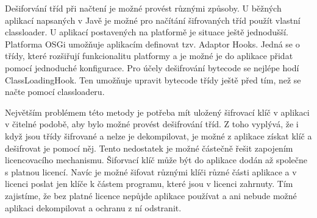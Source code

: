 Dešiforvání tříd při načtení je možné provést různými způsoby. U běžných
aplikací napsaných v Javě je možné pro načítání šifrovaných tříd použít vlastní
classloader. U aplikací postavených na platformě  je situace ještě
jednodušší. Platforma \gls{OSGi} umožňuje aplikacím definovat tzv. Adaptor
Hooks. Jedná se o třídy, které rozšiřují funkcionalitu platformy a je možné je
do aplikace přidat pomocí jednoduché konfigurace. Pro účely dešifrování bytecode
se nejlépe hodí ClassLoadingHook. Ten umožňuje upravit bytecode třídy ještě před
tím, než se načte pomocí classloaderu.

Největším problémem této metody je potřeba mít uložený šifrovací klíč v
aplikaci v čitelné podobě, aby bylo možné provést dešifrování tříd. Z toho
vyplývá, že i když jsou třídy šifrované a nelze je dekompilovat, je možné z
aplikace získat klíč a dešifrovat je pomocí něj. Tento nedostatek je možné
částečně řešit zapojením licencovacího mechanismu. Šiforvací klíč může
být do aplikace dodán až společne s platnou licencí. Navíc je možné šifovat
různými klíči různé části aplikace a v licenci poslat jen klíče k částem
programu, které jsou v licenci zahrnuty. Tím zajistíme, že bez platné licence
nepůjde aplikace používat a ani nebude možné aplikaci dekompilovat a ochranu z
ní odstranit.






